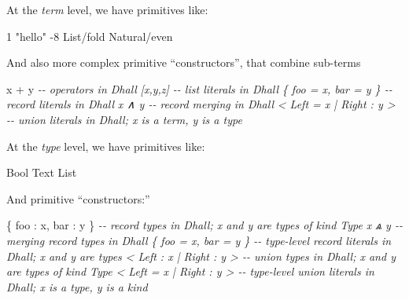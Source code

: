 \documentclass[]{article}
\newenvironment{Shaded}{}{}
\newcommand{\CommentTok}[1]{\textcolor[rgb]{0.38,0.63,0.69}{\textit{#1}}}
\newcommand{\DecValTok}[1]{\textcolor[rgb]{0.25,0.63,0.44}{#1}}
\newcommand{\NormalTok}[1]{#1}
\newcommand{\StringTok}[1]{\textcolor[rgb]{0.25,0.44,0.63}{#1}}
\begin{document}
At the \emph{term} level, we have primitives like:

\begin{Shaded}
\begin{Highlighting}[]
\DecValTok{1}
\StringTok{"hello"}
\NormalTok{{-}}\DecValTok{8}
\NormalTok{List/fold}
\NormalTok{Natural/even}
\end{Highlighting}
\end{Shaded}

And also more complex primitive ``constructors'', that combine sub-terms

\begin{Shaded}
\begin{Highlighting}[]
\NormalTok{x}\CommentTok{ }\NormalTok{+}\CommentTok{ }\NormalTok{y}\CommentTok{                       {-}{-} operators in Dhall}
\CommentTok{[x,y,z]                     {-}{-} list literals in Dhall}
\CommentTok{\{ foo = x, bar = y \}        {-}{-} record literals in Dhall}
\CommentTok{x ∧ y                       {-}{-} record merging in Dhall}
\CommentTok{\textless{} Left = x | Right : y \textgreater{}    {-}{-} union literals in Dhall; x is a term, y is a type}
\end{Highlighting}
\end{Shaded}

At the \emph{type} level, we have primitives like:

\begin{Shaded}
\begin{Highlighting}[]
\NormalTok{Bool}
\NormalTok{Text}
\NormalTok{List}
\end{Highlighting}
\end{Shaded}

And primitive ``constructors:''

\begin{Shaded}
\begin{Highlighting}[]
\NormalTok{\{}\CommentTok{ }\NormalTok{foo}\CommentTok{ }\NormalTok{:}\CommentTok{ }\NormalTok{x,}\CommentTok{ }\NormalTok{bar}\CommentTok{ }\NormalTok{:}\CommentTok{ }\NormalTok{y}\CommentTok{ }\NormalTok{\}}\CommentTok{       {-}{-} record types in Dhall; x and y are types of kind Type}
\CommentTok{x ⩓ y                      {-}{-} merging record types in Dhall}
\CommentTok{\{ foo = x, bar = y \}       {-}{-} type{-}level record literals in Dhall; x and y are types}
\CommentTok{\textless{} Left : x | Right : y \textgreater{}   {-}{-} union types in Dhall; x and y are types of kind Type}
\CommentTok{\textless{} Left = x | Right : y \textgreater{}   {-}{-} type{-}level union literals in Dhall; x is a type, y is a kind}
\end{Highlighting}
\end{Shaded}
\end{document}
